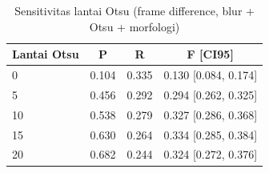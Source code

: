 \begin{table}[t]
\centering
\caption{Sensitivitas lantai Otsu (frame difference, blur + Otsu + morfologi)}
\label{tab:table_otsu_floor}
\begin{tabular}{lccc}
\toprule
Lantai Otsu & P & R & F [CI95] \\
\midrule
0 & 0.104 & 0.335 & 0.130 [0.084, 0.174] \\
5 & 0.456 & 0.292 & 0.294 [0.262, 0.325] \\
10 & 0.538 & 0.279 & 0.327 [0.286, 0.368] \\
15 & 0.630 & 0.264 & 0.334 [0.285, 0.384] \\
20 & 0.682 & 0.244 & 0.324 [0.272, 0.376] \\
\bottomrule
\end{tabular}
\end{table}
